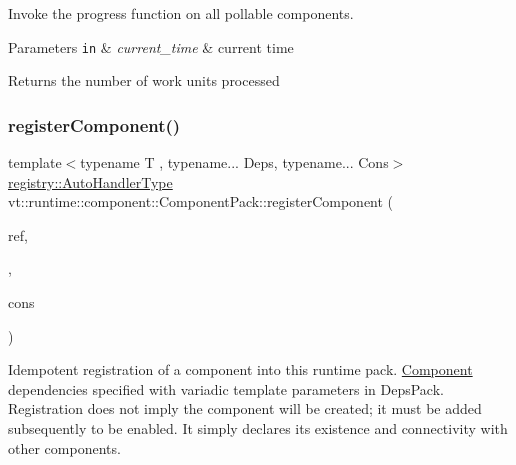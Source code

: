 Invoke the progress function on all pollable components. 


\begin{DoxyParams}[1]{Parameters}
\mbox{\tt in}  & {\em current\+\_\+time} & current time\\
\hline
\end{DoxyParams}
\begin{DoxyReturn}{Returns}
the number of work units processed 
\end{DoxyReturn}
\mbox{\label{structvt_1_1runtime_1_1component_1_1_component_pack_a956437fba91b2b90576df33276858df5}} 
\subsubsection{\texorpdfstring{register\+Component()}{registerComponent()}}
{\footnotesize\ttfamily template$<$typename T , typename... Deps, typename... Cons$>$ \\
\hyperlink{namespacevt_1_1runtime_1_1component_1_1registry_a9b86518797c7bb91babf0ca8ee7d06e6}{registry\+::\+Auto\+Handler\+Type} vt\+::runtime\+::component\+::\+Component\+Pack\+::register\+Component (\begin{DoxyParamCaption}\item[{T $\ast$$\ast$}]{ref,  }\item[{typename \hyperlink{structvt_1_1runtime_1_1component_1_1_base_component_1_1_deps_pack}{Base\+Component\+::\+Deps\+Pack}$<$ Deps... $>$}]{,  }\item[{Cons \&\&...}]{cons }\end{DoxyParamCaption})}



Idempotent registration of a component into this runtime pack. \hyperlink{structvt_1_1runtime_1_1component_1_1_component}{Component} dependencies specified with variadic template parameters in {\ttfamily Deps\+Pack}. Registration does not imply the component will be created; it must be added subsequently to be enabled. It simply declares its existence and connectivity with other components. 


